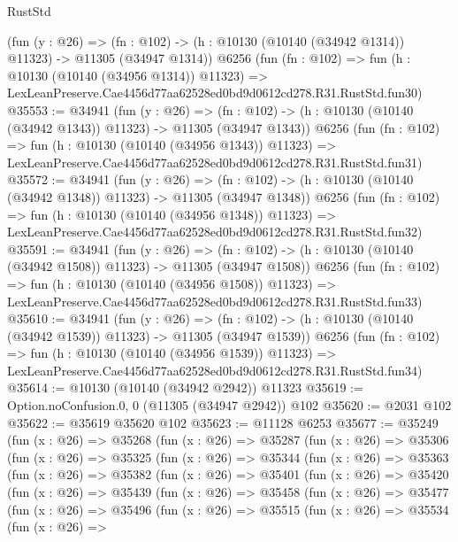 \begin{lexlean}{RustStd}
\begin{coremodule}
    (fun (y : @26) =>
    (fn : @102) -> (h : @10130 (@10140 (@34942 @1314)) @11323) -> @11305 (@34947 @1314))
    @6256
    (fun (fn : @102) =>
    fun (h : @10130 (@10140 (@34956 @1314)) @11323) =>
    LexLeanPreserve.Cae4456d77aa62528ed0bd9d0612cd278.R31.RustStd.fun30)
@35553 := @34941
    (fun (y : @26) =>
    (fn : @102) -> (h : @10130 (@10140 (@34942 @1343)) @11323) -> @11305 (@34947 @1343))
    @6256
    (fun (fn : @102) =>
    fun (h : @10130 (@10140 (@34956 @1343)) @11323) =>
    LexLeanPreserve.Cae4456d77aa62528ed0bd9d0612cd278.R31.RustStd.fun31)
@35572 := @34941
    (fun (y : @26) =>
    (fn : @102) -> (h : @10130 (@10140 (@34942 @1348)) @11323) -> @11305 (@34947 @1348))
    @6256
    (fun (fn : @102) =>
    fun (h : @10130 (@10140 (@34956 @1348)) @11323) =>
    LexLeanPreserve.Cae4456d77aa62528ed0bd9d0612cd278.R31.RustStd.fun32)
@35591 := @34941
    (fun (y : @26) =>
    (fn : @102) -> (h : @10130 (@10140 (@34942 @1508)) @11323) -> @11305 (@34947 @1508))
    @6256
    (fun (fn : @102) =>
    fun (h : @10130 (@10140 (@34956 @1508)) @11323) =>
    LexLeanPreserve.Cae4456d77aa62528ed0bd9d0612cd278.R31.RustStd.fun33)
@35610 := @34941
    (fun (y : @26) =>
    (fn : @102) -> (h : @10130 (@10140 (@34942 @1539)) @11323) -> @11305 (@34947 @1539))
    @6256
    (fun (fn : @102) =>
    fun (h : @10130 (@10140 (@34956 @1539)) @11323) =>
    LexLeanPreserve.Cae4456d77aa62528ed0bd9d0612cd278.R31.RustStd.fun34)
@35614 := @10130 (@10140 (@34942 @2942)) @11323
@35619 := Option.noConfusion.{0, 0} (@11305 (@34947 @2942)) @102
@35620 := @2031 @102
@35622 := @35619 @35620 @102
@35623 := @11128 @6253
@35677 := @35249
    (fun (x : @26) =>
    @35268
      (fun (x : @26) =>
      @35287
        (fun (x : @26) =>
        @35306
          (fun (x : @26) =>
          @35325
            (fun (x : @26) =>
            @35344
              (fun (x : @26) =>
              @35363
                (fun (x : @26) =>
                @35382
                  (fun (x : @26) =>
                  @35401
                    (fun (x : @26) =>
                    @35420
                      (fun (x : @26) =>
                      @35439
                        (fun (x : @26) =>
                        @35458
                          (fun (x : @26) =>
                          @35477
                            (fun (x : @26) =>
                            @35496
                              (fun (x : @26) =>
                              @35515
                                (fun (x : @26) =>
                                @35534
                                  (fun (x : @26) =>

\end{coremodule}
\end{lexlean}
